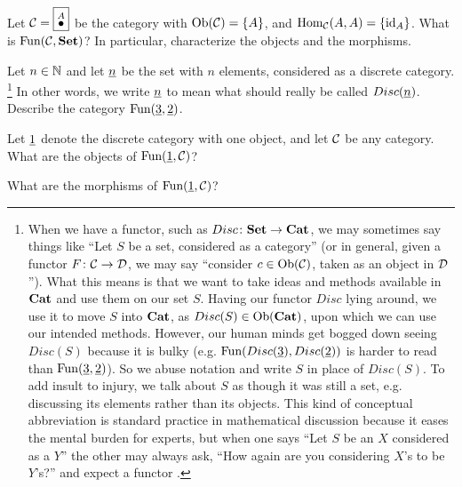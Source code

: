 \documentclass[CT4S-EN-RU]{subfiles}
\begin{document}
\begin{exercise}
Let $\mathcal{C}=\fbox{$\stackrel{A}{\bullet}$}$ be the category with $\textnormal{Ob}(\mathcal{C})=\{A\}$, and $\textnormal{Hom}_\mathcal{C}(A,A)=\{\textnormal{id}_A\}$. What is $\textnormal{Fun}(\mathcal{C},{\bf Set})$? In particular, characterize the objects and the morphisms.
\end{exercise}

\begin{exercise}
Let $n\in{\mathbb N}$ and let $\underline{n}$ be the set with $n$ elements, considered as a discrete category.
\footnote{When we have a functor, such as $Disc\colon{\bf Set}\rightarrow{\bf Cat}$, we may sometimes say things like “Let $S$ be a set, considered as a category” (or in general, given a functor $F\colon\mathcal{C}\rightarrow\mathcal{D}$, we may say “consider $c\in\textnormal{Ob}(\mathcal{C})$, taken as an object in $\mathcal{D}$”). What this means is that we want to take ideas and methods available in ${\bf Cat}$ and use them on our set $S$. Having our functor $Disc$ lying around, we use it to move $S$ into ${\bf Cat}$, as $Disc(S)\in\textnormal{Ob}({\bf Cat})$, upon which we can use our intended methods. However, our human minds get bogged down seeing $Disc(S)$ because it is bulky (e.g. $\textnormal{Fun}(Disc(\underline{3}),Disc(\underline{2}))$ is harder to read than $\textnormal{Fun}(\underline{3},\underline{2})$). So we abuse notation and write $S$ in place of  $Disc(S)$. To add insult to injury, we talk about $S$ as though it was still a set, e.g. discussing its elements rather than its objects. This kind of conceptual abbreviation is standard practice in mathematical discussion because it eases the mental burden for experts, but when one says “Let $S$ be an $X$ considered as a $Y$” the other may always ask, “How again are you considering $X$'s to be $Y$'s?” and expect a functor .}
In other words, we write $\underline{n}$ to mean what should really be called $Disc(\underline{n})$. Describe the category $\textnormal{Fun}(\underline{3},\underline{2})$.
\end{exercise}

\begin{exercise}
Let $\underline{1}$ denote the discrete category with one object, and let $\mathcal{C}$ be any category.
\sexc What are the objects of $\textnormal{Fun}(\underline{1},\mathcal{C})$?
\item What are the morphisms of $\textnormal{Fun}(\underline{1},\mathcal{C})$?
\endsexc
\end{exercise}
\end{document}
